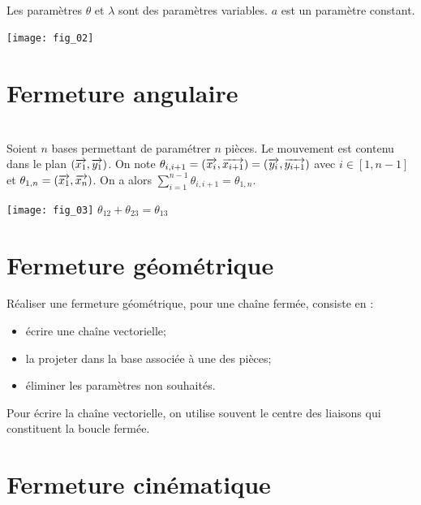 \begin{exemple}~\\ Les paramètres $\theta$ et $\lambda$ sont des paramètres variables. $a$ est un paramètre constant. 
\begin{center}
\texttt{[image: fig\_02]}
\end{center}
\end{exemple}
\section{Fermeture angulaire}

\noindent\begin{minipage}[c]{.65\linewidth}
\begin{methode}~\\
Soient $n$ bases permettant de paramétrer $n$ pièces. Le mouvement est contenu dans le plan $\left(\overrightarrow{x_1},\overrightarrow{y_1}\right)$. On note $\theta_{i,i+1}=\left(\overrightarrow{x_i},\overrightarrow{x_{i+1}}\right)=\left(\overrightarrow{y_i},\overrightarrow{y_{i+1}}\right)$ avec $i \in [1,n-1]$ et $\theta_{1,n}=\left(\overrightarrow{x_1},\overrightarrow{x_{n}}\right)$. On a alors $\sum\limits_{i=1}^{n-1}\theta_{i,i+1}=\theta_{1,n}$.
\end{methode}
\end{minipage}\hfill
\begin{minipage}[c]{.25\linewidth}
\begin{center}
\texttt{[image: fig\_03]}
$\theta_{12}+\theta_{23}=\theta_{13}$

\end{center}
\end{minipage}

\section{Fermeture géométrique}
\begin{methode}
Réaliser une fermeture géométrique, pour une chaîne fermée, consiste en :
\begin{itemize}
\item écrire une chaîne vectorielle; 
\item la projeter dans la base associée à une des pièces;
\item éliminer les paramètres non souhaités. 
\end{itemize}
Pour écrire la chaîne vectorielle, on utilise souvent le centre des liaisons qui constituent la boucle fermée.
\end{methode}
\section{Fermeture cinématique}


